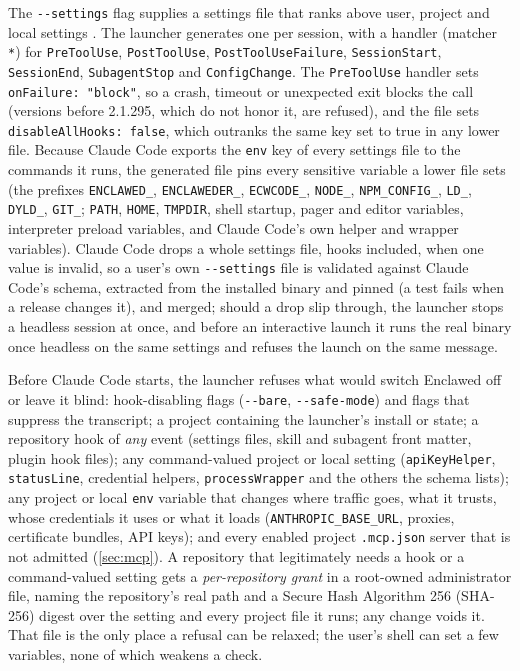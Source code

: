 \documentclass[11pt]{article}
\newcommand{\sys}{Enclawed}
\begin{document}
The \texttt{-{}-settings} flag supplies a settings file that ranks above
user, project and local settings \cite{cc-settings}. The launcher
generates one per session, with a handler (matcher \texttt{*}) for
\texttt{PreToolUse}, \texttt{PostToolUse}, \texttt{PostToolUseFailure},
\texttt{SessionStart}, \texttt{SessionEnd}, \texttt{SubagentStop} and
\texttt{ConfigChange}. The \texttt{PreToolUse} handler sets
\texttt{onFailure: "block"}, so a crash, timeout or unexpected exit blocks
the call (versions before 2.1.295, which do not honor it, are refused),
and the file sets \texttt{disableAllHooks: false}, which outranks the
same key set to true in any lower file. Because Claude Code exports the
\texttt{env} key of every settings file to the commands it runs, the
generated file pins every sensitive variable a lower file sets (the
prefixes \texttt{ENCLAWED\_}, \texttt{ENCLAWEDER\_}, \texttt{ECWCODE\_},
\texttt{NODE\_}, \texttt{NPM\_CONFIG\_}, \texttt{LD\_}, \texttt{DYLD\_},
\texttt{GIT\_}; \texttt{PATH}, \texttt{HOME}, \texttt{TMPDIR}, shell
startup, pager and editor variables, interpreter preload variables, and
Claude Code's own helper and wrapper variables). Claude Code drops a
whole settings file, hooks included, when one value is invalid, so a
user's own \texttt{-{}-settings} file is validated against Claude Code's
schema, extracted from the installed binary and pinned (a test fails
when a release changes it), and merged; should a drop slip through, the
launcher stops a headless session at once, and before an interactive
launch it runs the real binary once headless on the same settings and
refuses the launch on the same message.

Before Claude Code starts, the launcher refuses what would switch \sys{}
off or leave it blind: hook-disabling flags (\texttt{-{}-bare},
\texttt{-{}-safe-mode}) and flags that suppress the transcript; a project
containing the launcher's install or state; a repository hook of
\emph{any} event (settings files, skill and subagent front matter, plugin
hook files); any command-valued project or local setting
(\texttt{apiKeyHelper}, \texttt{statusLine}, credential helpers,
\texttt{processWrapper} and the others the schema lists); any project or
local \texttt{env} variable that changes where traffic goes, what it
trusts, whose credentials it uses or what it loads
(\texttt{ANTHROPIC\_BASE\_URL}, proxies, certificate bundles, API keys);
and every enabled project \texttt{.mcp.json} server that is not admitted
(\cref{sec:mcp}). A repository that legitimately needs a hook or a
command-valued setting gets a \emph{per-repository grant} in a
root-owned administrator file, naming the repository's real path and a
Secure Hash Algorithm 256 (SHA-256) digest over the setting and every
project file it runs; any change voids it. That file is the only place a
refusal can be relaxed; the user's shell can set a few variables, none
of which weakens a check.
\end{document}
